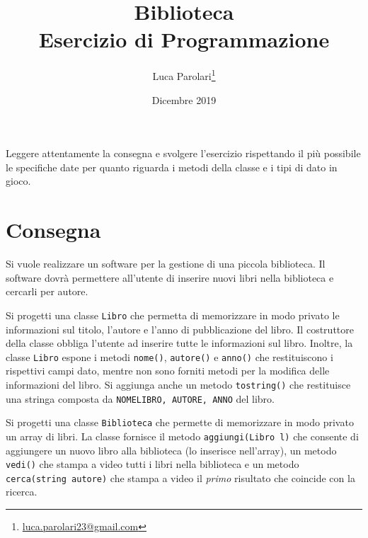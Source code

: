 \documentclass[addpoints,12pt,answers]{exam}
\author{Luca Parolari\footnote{\href{mailto:luca.parolari23@gmail.com}{luca.parolari23@gmail.com}}}
\begin{document}
    
    \title{Biblioteca\\ \large Esercizio di Programmazione}
    \date{Dicembre 2019}
    
    \maketitle
    
    Leggere attentamente la consegna e svolgere l'esercizio rispettando il più possibile le specifiche date per quanto riguarda i metodi della classe e i tipi di dato in gioco.
    
    \section{Consegna}
    Si vuole realizzare un software per la gestione di una piccola biblioteca. Il software dovrà permettere all'utente di inserire nuovi libri nella biblioteca e cercarli per autore.
    
    Si progetti una classe \texttt{Libro} che permetta di memorizzare in modo privato le informazioni sul titolo, l'autore e l'anno di pubblicazione del libro. Il costruttore della classe obbliga l'utente ad inserire tutte le informazioni sul libro. Inoltre, la classe \texttt{Libro} espone i metodi \texttt{nome()}, \texttt{autore()} e \texttt{anno()} che restituiscono i rispettivi campi dato, mentre non sono forniti metodi per la modifica delle informazioni del libro. Si aggiunga anche un metodo \texttt{to\textunderscore string()} che restituisce una stringa composta da \texttt{NOME\textunderscore LIBRO, AUTORE, ANNO} del libro.
    
    Si progetti una classe \texttt{Biblioteca} che permette di memorizzare in modo privato un array di libri. La classe fornisce il metodo \texttt{aggiungi(Libro l)} che consente di aggiungere un nuovo libro alla biblioteca (lo inserisce nell'array), un metodo \texttt{vedi()} che stampa a video tutti i libri nella biblioteca e un metodo \texttt{cerca(string autore)} che stampa a video il \emph{primo} risultato che coincide con la ricerca.
    
\end{document}

